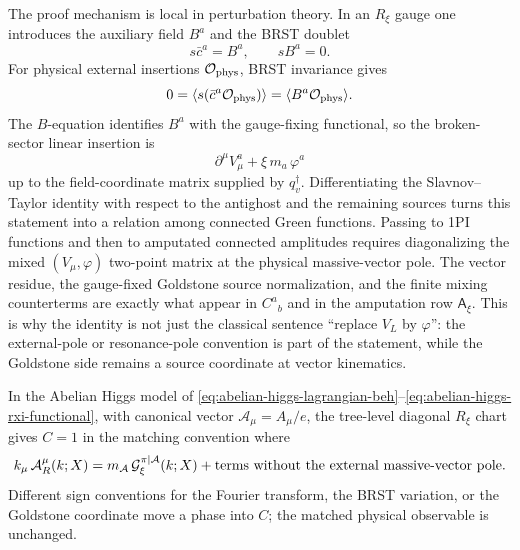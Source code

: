 The proof mechanism is local in perturbation theory.  In an \(R_\xi\) gauge one
introduces the auxiliary field \(B^a\) and the BRST doublet
\[
  s\bar c^a=B^a,\qquad sB^a=0 .
\]
For physical external insertions \(\mathcal O_{\rm phys}\), BRST invariance
gives
\[
  0=\langle s(\bar c^a\mathcal O_{\rm phys})\rangle
   =\langle B^a\mathcal O_{\rm phys}\rangle .
\]
The \(B\)-equation identifies \(B^a\) with the gauge-fixing functional, so the
broken-sector linear insertion is
\[
  \partial^\mu V^a_\mu+\xi\,m_a\,\varphi^a
\]
up to the field-coordinate matrix supplied by \(q_v^\dagger\).  Differentiating
the Slavnov--Taylor identity with respect to the antighost and the remaining
sources turns this statement into a relation among connected Green functions.
Passing to 1PI functions and then to amputated connected amplitudes requires
diagonalizing the mixed \((V_\mu,\varphi)\) two-point matrix at the physical
massive-vector pole.  The vector residue, the gauge-fixed Goldstone source
normalization, and the finite mixing counterterms are exactly what appear in
\(C^a{}_{b}\) and in the amputation row \(\mathsf A_\xi\).  This is why the
identity is not just the classical sentence ``replace \(V_L\) by
\(\varphi\)'': the external-pole or resonance-pole convention is part of the
statement, while the Goldstone side remains a source coordinate at vector
kinematics.

In the Abelian Higgs model of
\eqref{eq:abelian-higgs-lagrangian-beh}--\eqref{eq:abelian-higgs-rxi-functional},
with canonical vector \(\mathcal A_\mu=A_\mu/e\), the tree-level diagonal
\(R_\xi\) chart gives \(C=1\) in the matching convention where
\begin{equation}
  k_\mu\,\mathcal A_R^\mu(k;X)
  =
  m_{\mathcal A}\,\mathcal G_\xi^{\pi|\mathcal A}(k;X)
  +
  \hbox{terms without the external massive-vector pole}.
  \label{eq:abelian-higgs-tree-equivalence}
\end{equation}
Different sign conventions for the Fourier transform, the BRST variation, or
the Goldstone coordinate move a phase into \(C\); the matched physical
observable is unchanged.

